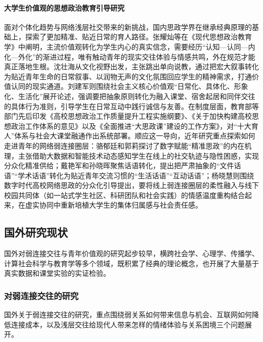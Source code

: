\paragraph{大学生价值观的思想政治教育引导研究}
面对个体化趋势与网络浅层社交带来的新挑战，国内思政学界在继承经典原理的基础上，探索了更加精准、贴近日常的育人路径。张耀灿等在《现代思想政治教育学》中阐明，主流价值观转化为学生内心的真实信念，需要经历“认知—认同—内化—外化”的渐进过程，唯有触动青年的现实交往体验与情感共鸣，外在规范才能真正落地生根\cite{Zhang2006}。沈壮海从文化视野出发，主张跳出单向说教，通过把宏大叙事转化为贴近青年生命的日常叙事、以润物无声的文化氛围回应学生的精神需求，打通价值认同的现实通道\cite{Shen2013}。刘建军则围绕社会主义核心价值观“日常化、具体化、形象化、生活化”展开论述，强调要把抽象原则转化为融入课堂、宿舍起居和同伴交往的具体行为准则，引导学生在日常互动中践行诚信与友善\cite{Liu2016}。在制度层面，教育部等部门先后印发《高校思想政治工作质量提升工程实施纲要》\cite{MOE2017_Gangyao}、《关于加快构建高校思想政治工作体系的意见》\cite{MOE2020_Gangshen}以及《全面推进“大思政课”建设的工作方案》\cite{MOE2022_Fangan}，对“十大育人”体系与社会大课堂融通作出系统部署。顺应这一导向，近年研究重点探索如何走进青年的网络弱连接圈层：骆郁廷和郭莉探讨了数字赋能“精准思政”的内在机理，主张借助大数据和智能技术动态感知学生在线上的社交轨迹与隐性困惑，实现分众化精准供给\cite{Luo2022}；戴艳军和孙晓晖聚焦话语转化，提出把严肃抽象的“文件话语”“学术话语”转化为贴近青年交流习惯的“生活话语”“互动话语”\cite{Dai2021}；杨晓慧则围绕数字时代高校网络思政的分众化引导提出，要将线上弱连接圈层的柔性融入与线下校园共同体（如一站式学生社区、科研团队和社会实践）的情感温度重构结合起来，在虚实协同中重新培植大学生的集体归属感与社会责任感\cite{Yang2023}。

\subsection{国外研究现状}
\label{sec:international-research}

国外对弱连接交往与青年价值观的研究起步较早，横跨社会学、心理学、传播学、计算社会科学与教育学等多个领域，既积累了经典的理论概念，也开展了大量基于真实数据和课堂实验的实证检验。

\subsubsection{对弱连接交往的研究}

国外关于弱连接交往的研究，重点围绕弱关系如何带来信息与机会、互联网如何降低连接成本，以及浅层交往给现代人带来怎样的情绪体验与关系困境三个问题展开。

